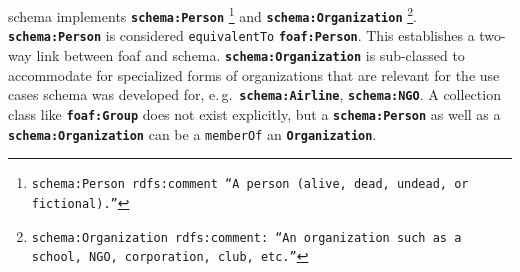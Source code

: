 \documentclass[a4paper, DIV=13, BCOR=0cm]{scrbook}
\newcommand{\eg}{e.\,g.\ }
\newcommand{\class}[1]{\texttt{\textbf{#1}}}
\newcommand{\relation}[1]{\texttt{#1}}
\newcommand{\foottt}[1]{\footnote{\texttt{#1}}}
\begin{document}
\gls{schema} implements
\class{schema:Person}%
	\foottt{schema:Person rdfs:comment \enquote{A person (alive, dead, undead, or fictional).}} and
%
\class{schema:Organization}%
	\foottt{schema:Organization rdfs:comment: \enquote{An organization such as a school, NGO, corporation, club, etc.}}.
%
\class{schema:Person} is considered \relation{equivalentTo} \class{foaf:Person}. This establishes a two-way link between \gls{foaf} and \gls{schema}. \class{schema:Organization} is sub-classed to accommodate for specialized forms of organizations that are relevant for the use cases schema was developed for, \eg \class{schema:Airline}, \class{schema:NGO}. A collection class like \class{foaf:Group} does not exist explicitly, but a \class{schema:Person} as well as a \class{schema:Organization} can be a \relation{memberOf} an \class{Organization}.
\end{document}
